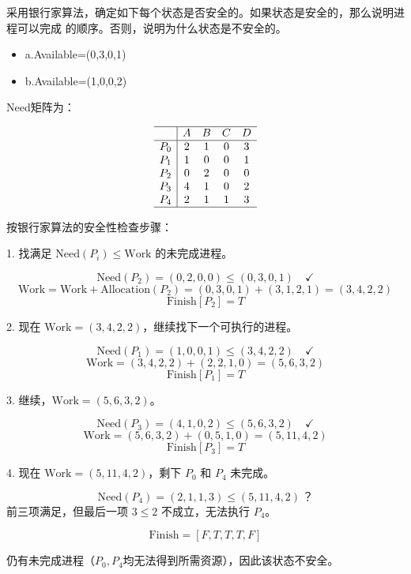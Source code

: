 \documentclass[UTF8]{homework}
\begin{document}
\begin{homeworkProblem}
采用银行家算法，确定如下每个状态是否安全的。如果状态是安全的，那么说明进程可以完成
的顺序。否则，说明为什么状态是不安全的。

\begin{itemize}
    \item a.Available=(0,3,0,1)
    \item b.Available=(1,0,0,2)
\end{itemize}

\solution

Need矩阵为：

\[
\begin{array}{c|cccc}
\hline
   & A & B & C & D \\ \hline
P_0 & 2 & 1 & 0 & 3 \\
P_1 & 1 & 0 & 0 & 1 \\
P_2 & 0 & 2 & 0 & 0 \\
P_3 & 4 & 1 & 0 & 2 \\
P_4 & 2 & 1 & 1 & 3 \\ \hline
\end{array}
\]

按银行家算法的安全性检查步骤：

1. 找满足 $\text{Need}(P_i) \leq \text{Work}$ 的未完成进程。

   \[
   \text{Need}(P_2) = (0,2,0,0) \leq (0,3,0,1) \quad \checkmark
   \]
   \[
   \text{Work} = \text{Work} + \text{Allocation}(P_2) = (0,3,0,1) + (3,1,2,1) = (3,4,2,2)
   \]
   \[
   \text{Finish}[P_2] = T
   \]

2. 现在 $\text{Work} = (3,4,2,2)$，继续找下一个可执行的进程。

   \[
   \text{Need}(P_1) = (1,0,0,1) \leq (3,4,2,2) \quad \checkmark
   \]
   \[
   \text{Work} = (3,4,2,2) + (2,2,1,0) = (5,6,3,2)
   \]
   \[
   \text{Finish}[P_1] = T
   \]

3. 继续，$\text{Work} = (5,6,3,2)$。

   \[
   \text{Need}(P_3) = (4,1,0,2) \leq (5,6,3,2) \quad \checkmark
   \]
   \[
   \text{Work} = (5,6,3,2) + (0,5,1,0) = (5,11,4,2)
   \]
   \[
   \text{Finish}[P_3] = T
   \]

4. 现在 $\text{Work} = (5,11,4,2)$，剩下 $P_0$ 和 $P_4$ 未完成。

   \[
   \text{Need}(P_4) = (2,1,1,3) \leq (5,11,4,2)\,？ 
   \]
   前三项满足，但最后一项 $3 \leq 2$ 不成立，无法执行 $P_4$。

\[
\text{Finish} = [F,T,T,T,F]
\]

仍有未完成进程（$P_0,P_4$均无法得到所需资源），因此该状态不安全。


\end{homeworkProblem}
\end{document}
